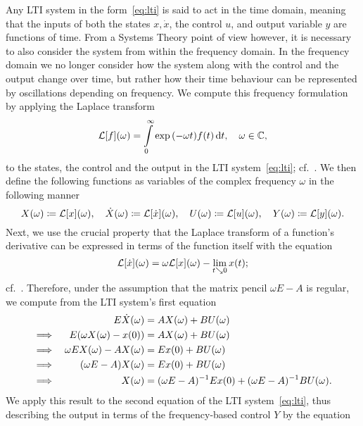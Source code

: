 Any \ac{LTI} system in the form~\eqref{eq:lti} is said to act in the time domain, meaning that the inputs of both the states $x, \dot{x}$, the control $u$, and output variable $y$ are functions of time.
From a Systems Theory point of view however, it is necessary to also consider the system from within the frequency domain.
In the frequency domain we no longer consider how the system along with the control and the output change over time, but rather how their time behaviour can be represented by oscillations depending on frequency.
We compute this frequency formulation by applying the Laplace transform
\begin{equation*}\label{eq:laplace-trafo}
    \mathcal{L}[f](\omega) = \int\limits_0^\infty \exp{(- \omega t)} f(t) \mathop{}\!\mathrm{d} t,\quad \omega \in \mathbb{C},
\end{equation*}
to the states, the control and the output in the \ac{LTI} system~\eqref{eq:lti}; cf.~\cite{Arendt2011}.
We then define the following functions as variables of the complex frequency $\omega$ in the following manner
\begin{equation}
    X(\omega) \coloneqq \mathcal{L}[x](\omega),\quad \dot{X}(\omega) \coloneqq \mathcal{L}[\dot{x}](\omega),\quad U(\omega) \coloneqq \mathcal{L}[u](\omega),\quad Y(\omega) \coloneqq \mathcal{L}[y](\omega).
\end{equation}
Next, we use the crucial property that the Laplace transform of a function's derivative can be expressed in terms of the function itself with the equation
\begin{equation*}
    \mathcal{L}[\dot{x}](\omega) = \omega \mathcal{L}[x](\omega) - \lim\limits_{t \searrow 0} x(t);
\end{equation*}
cf.~\cite[Theorem~9.1]{Doetsch1974}.
Therefore, under the assumption that the matrix pencil $\omega E - A$ is regular, we compute from the \ac{LTI} system's first equation
\begin{alignat*}{3}
     & & E \dot{X}(\omega) &= A X(\omega) + B U(\omega) \\
    \implies & & E (\omega X(\omega) - x(0)) &= A X(\omega) + B U(\omega) \\
    \implies & & \omega E X(\omega) - A X(\omega) &= E x(0) + B U(\omega) \\
    \implies & & (\omega E - A) X(\omega) &= E x(0) + B U(\omega) \\
    \implies & & X(\omega) &= (\omega E - A)^{-1} E x(0) + (\omega E - A)^{-1} B U(\omega).
\end{alignat*}
We apply this result to the second equation of the \ac{LTI} system~\eqref{eq:lti}, thus describing the output in terms of the frequency-based control $Y$ by the equation
